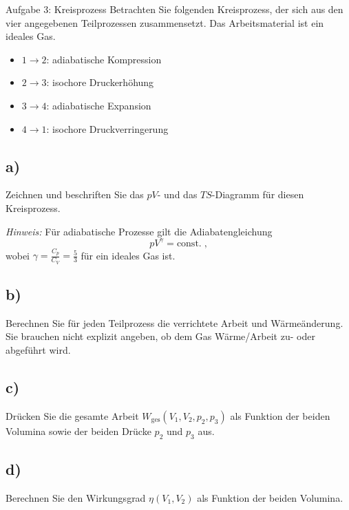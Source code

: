 \begin{aufgabe}{Aufgabe 3: Kreisprozess}
    Betrachten Sie folgenden Kreisprozess, der sich aus den vier angegebenen Teilprozessen zusammensetzt.
    Das Arbeitsmaterial ist ein ideales Gas.
    \begin{itemize}
        \item $1 \to 2$: adiabatische Kompression
        \item $2 \to 3$: isochore Druckerhöhung
        \item $3 \to 4$: adiabatische Expansion
        \item $4 \to 1$: isochore Druckverringerung
    \end{itemize}

    \subsection{a)}
    Zeichnen und beschriften Sie das $pV$- und das $TS$-Diagramm für diesen Kreisprozess.

    \textit{Hinweis:} Für adiabatische Prozesse gilt die Adiabatengleichung
    \[
        pV^\gamma = \text{const.} \;,
    \]
    wobei $\gamma = \frac{C_p}{C_V} = \frac{5}{3}$ für ein ideales Gas ist.

    \subsection{b)}
    Berechnen Sie für jeden Teilprozess die verrichtete Arbeit und Wärmeänderung.
    Sie brauchen nicht explizit angeben, ob dem Gas Wärme/Arbeit zu- oder abgeführt wird.

    \subsection{c)}
    Drücken Sie die gesamte Arbeit $W_\text{ges}(V_1, V_2, p_2, p_3)$ als Funktion der beiden Volumina sowie der beiden Drücke $p_2$ und $p_3$ aus.

    \subsection{d)}
    Berechnen Sie den Wirkungsgrad $\eta(V_1, V_2)$ als Funktion der beiden Volumina.
\end{aufgabe}

